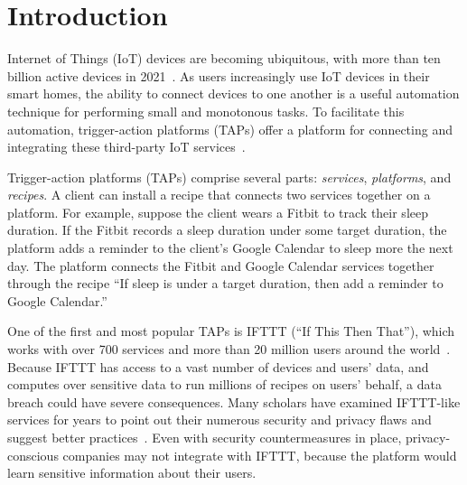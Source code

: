 \section{Introduction}
\label{sec:intro}

Internet of Things (IoT) devices are becoming ubiquitous, with more than ten
billion active devices in 2021~\cite{DBLP:webpage/Bojan/IoTstats}. As users
increasingly use IoT devices in their smart homes, the ability to connect
devices to one another is a useful automation technique for performing small and
monotonous tasks. To facilitate this automation, trigger-action platforms (TAPs)
offer a platform for connecting and integrating these third-party IoT
services~\cite{DBLP:journals/access/XuZZCDG19, DBLP:conf/chi/UrHBLMPSL16}.

Trigger-action platforms (TAPs) comprise several parts: \emph{services},
\emph{platforms}, and \emph{recipes}. A client can install a recipe that
connects two services together on a platform. For example, suppose the client
wears a Fitbit to track their sleep duration. If the Fitbit records a sleep
duration under some target duration, the platform adds a reminder to the
client's Google Calendar to sleep more the next day. The platform connects the
Fitbit and Google Calendar services together through the recipe ``If sleep is
under a target duration, then add a reminder to Google Calendar.'' 

One of the first and most popular TAPs is IFTTT (``If This Then That''), which
works with over 700 services and more than 20 million users around the
world~\cite{ifttt-website, DBLP:conf/sp/ChenCWSCF21}.  Because IFTTT has access
to a vast number of devices and users' data, and computes over sensitive data to
run millions of recipes on users' behalf, a data breach could have severe
consequences. Many scholars have examined IFTTT-like services for years to point
out their numerous security and privacy flaws and suggest better
practices~\cite{DBLP:conf/sp/ChenCWSCF21, DBLP:journals/corr/abs-2009-12447,
  DBLP:conf/imc/MiQZW17, DBLP:journals/corr/FernandesRJP17,
  DBLP:conf/www/SurbatovichABDJ17, DBLP:journals/access/XuZZCDG19}.  Even with
security countermeasures in place, privacy-conscious companies may not integrate
with IFTTT, because the platform would learn sensitive information about their
users.

